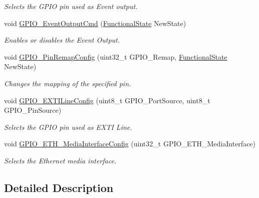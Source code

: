 \begin{DoxyCompactItemize}
\begin{DoxyCompactList}\small\item\em Selects the G\+P\+IO pin used as Event output. \end{DoxyCompactList}\item 
void \mbox{\hyperlink{group___g_p_i_o___exported___functions_gaf13ab3d59e467df44b492f1cdfe2f588}{G\+P\+I\+O\+\_\+\+Event\+Output\+Cmd}} (\mbox{\hyperlink{group___exported__types_gac9a7e9a35d2513ec15c3b537aaa4fba1}{Functional\+State}} New\+State)
\begin{DoxyCompactList}\small\item\em Enables or disables the Event Output. \end{DoxyCompactList}\item 
void \mbox{\hyperlink{group___g_p_i_o___exported___functions_ga64eb76f6211b840daf9829289df4208b}{G\+P\+I\+O\+\_\+\+Pin\+Remap\+Config}} (uint32\+\_\+t G\+P\+I\+O\+\_\+\+Remap, \mbox{\hyperlink{group___exported__types_gac9a7e9a35d2513ec15c3b537aaa4fba1}{Functional\+State}} New\+State)
\begin{DoxyCompactList}\small\item\em Changes the mapping of the specified pin. \end{DoxyCompactList}\item 
void \mbox{\hyperlink{group___g_p_i_o___exported___functions_ga8c1f13646d7418827378032a584da653}{G\+P\+I\+O\+\_\+\+E\+X\+T\+I\+Line\+Config}} (uint8\+\_\+t G\+P\+I\+O\+\_\+\+Port\+Source, uint8\+\_\+t G\+P\+I\+O\+\_\+\+Pin\+Source)
\begin{DoxyCompactList}\small\item\em Selects the G\+P\+IO pin used as E\+X\+TI Line. \end{DoxyCompactList}\item 
void \mbox{\hyperlink{group___g_p_i_o___exported___functions_gacbfad958f684347be0f2c762dc85c3c2}{G\+P\+I\+O\+\_\+\+E\+T\+H\+\_\+\+Media\+Interface\+Config}} (uint32\+\_\+t G\+P\+I\+O\+\_\+\+E\+T\+H\+\_\+\+Media\+Interface)
\begin{DoxyCompactList}\small\item\em Selects the Ethernet media interface. \end{DoxyCompactList}\end{DoxyCompactItemize}


\subsection{Detailed Description}


